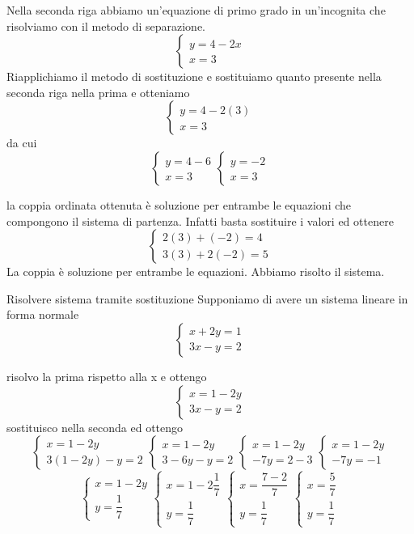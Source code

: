 Nella seconda riga abbiamo un'equazione di primo grado in un'incognita che risolviamo con il metodo di separazione.
\[ 
\begin{cases}
	y=4-2x\\
	x=3
\end{cases}\]
Riapplichiamo il metodo di sostituzione e sostituiamo quanto presente nella seconda riga nella prima e otteniamo
\[ 
\begin{cases}
y=4-2(3)\\
x=3
\end{cases}\]
da cui
\[ 
\begin{cases}
y=4-6\\
x=3
\end{cases}
\begin{cases}
y=-2\\
x=3
\end{cases}\]

la coppia ordinata ottenuta è soluzione per entrambe le equazioni che compongono il sistema di partenza. Infatti basta sostituire i valori ed ottenere
	\[
\begin{cases}
2(3)+(-2)=4\\
3(3)+2(-2)=5
\end{cases}
\]
La coppia è soluzione per entrambe le equazioni. Abbiamo risolto il sistema.
\begin{esempiot}{Risolvere sistema tramite sostituzione}{}
Supponiamo di avere un sistema lineare in forma normale
\[
\begin{cases}
	x+2y=1\\
	3x-y=2
\end{cases}
\]
\end{esempiot}
risolvo la prima rispetto alla x e ottengo 
\[
\begin{cases}
	x=1-2y\\
	3x-y=2
\end{cases}
\]
sostituisco nella seconda ed ottengo
\[
\begin{cases}
	x=1-2y\\
	3(1-2y)-y=2
\end{cases}
\begin{cases}
	x=1-2y\\
	3-6y-y=2
\end{cases}
\begin{cases}
	x=1-2y\\
	-7y=2-3
\end{cases}
\begin{cases}
	x=1-2y\\
	-7y=-1
\end{cases}
\]
\[
\begin{cases}
	x=1-2y\\
	y=\dfrac{1}{7}
\end{cases}
\begin{cases}
	x=1-2\dfrac{1}{7}\\
	y=\dfrac{1}{7}
\end{cases}
\begin{cases}
	x=\dfrac{7-2}{7} \\
	y=\dfrac{1}{7}
\end{cases}
\begin{cases}
	x=\dfrac{5}{7}\\
	y=\dfrac{1}{7}
\end{cases}
\]
